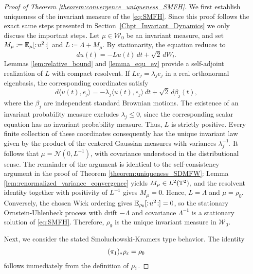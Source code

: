 \begin{proof}[Proof of Theorem \ref{theorem:convergence_uniqueness_SMFH}]
    We first establish uniqueness of the invariant measure of the
\eqref{eq:SMFH}. Since this proof follows the exact same steps presented in Section~\ref{Chpt_Invariant_Dynamics} we only discuss the important steps. 
Let $\mu\in\mathcal W_0$ be an invariant measure,
and set $M_\mu\coloneqq\mathbb E_\mu[:\! u^2 \!:]$ and
$L\coloneqq\Lambda+M_\mu$. By stationarity, the equation reduces to
\[
    du(t)=-Lu(t)\,dt+\sqrt{2}\,dW_t.
\]
Lemmas \ref{lem:relative_bound} and \ref{lemma_equ_ev} provide a
self-adjoint realization of $L$ with compact resolvent. If
$Le_j=\lambda_j e_j$ in a real orthonormal eigenbasis, the
corresponding coordinates satisfy
\[
    d\langle u(t),e_j\rangle
    =-\lambda_j\langle u(t),e_j\rangle\,dt+\sqrt{2}\,d\beta_j(t),
\]
where the $\beta_j$ are independent standard Brownian motions.
The existence of an invariant probability measure excludes
$\lambda_j\leq0$, since the corresponding scalar equation has
no invariant probability measure. Thus, $L$ is strictly positive.
Every finite collection of these coordinates consequently has
the unique invariant law given by the product of the centered
Gaussian measures with variances $\lambda_j^{-1}$. It follows
that $\mu=\mathcal N(0,L^{-1})$, with covariance understood in
the distributional sense. The remainder of the argument is
identical to the self-consistency argument in the proof of
Theorem \ref{theorem:uniqueness_SDMFW}: Lemma
\ref{lem:renormalized_variance_convergence} yields
$M_\mu\in L^2(\mathbb{T}^2)$, and the resolvent identity together with
positivity of $L^{-1}$ gives $M_\mu=0$. Hence, $L=\Lambda$ and
$\mu=\rho_0$. Conversely, the chosen Wick ordering gives
$\mathbb E_{\rho_0}[:\! u^2 \!:]=0$, so the stationary
Ornstein-Uhlenbeck process with drift $-\Lambda$ and covariance
$\Lambda^{-1}$ is a stationary solution of \eqref{eq:SMFH}.
Therefore, $\rho_0$ is the unique invariant measure in
$\mathcal W_0$.

Next, we consider the stated Smoluchowski-Kramers type behavior.
    The identity
    \[
        (\pi_1)_*\rho_\varepsilon=\rho_0
    \]
    follows immediately from the definition of \(\rho_\varepsilon\).


\end{proof}
